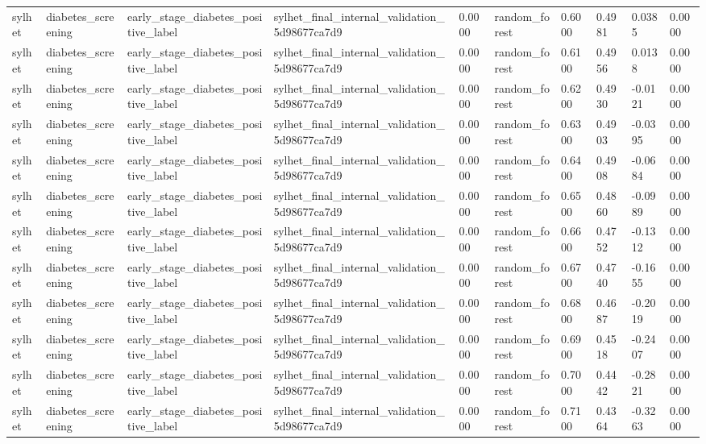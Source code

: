 \begin{tabular}{llllllllll}
sylhet & diabetes\_screening & early\_stage\_diabetes\_positive\_label & sylhet\_final\_internal\_validation\_5d98677ca7d9 & 0.0000 & random\_forest & 0.6000 & 0.4981 & 0.0385 & 0.0000 \\
sylhet & diabetes\_screening & early\_stage\_diabetes\_positive\_label & sylhet\_final\_internal\_validation\_5d98677ca7d9 & 0.0000 & random\_forest & 0.6100 & 0.4956 & 0.0138 & 0.0000 \\
sylhet & diabetes\_screening & early\_stage\_diabetes\_positive\_label & sylhet\_final\_internal\_validation\_5d98677ca7d9 & 0.0000 & random\_forest & 0.6200 & 0.4930 & -0.0121 & 0.0000 \\
sylhet & diabetes\_screening & early\_stage\_diabetes\_positive\_label & sylhet\_final\_internal\_validation\_5d98677ca7d9 & 0.0000 & random\_forest & 0.6300 & 0.4903 & -0.0395 & 0.0000 \\
sylhet & diabetes\_screening & early\_stage\_diabetes\_positive\_label & sylhet\_final\_internal\_validation\_5d98677ca7d9 & 0.0000 & random\_forest & 0.6400 & 0.4908 & -0.0684 & 0.0000 \\
sylhet & diabetes\_screening & early\_stage\_diabetes\_positive\_label & sylhet\_final\_internal\_validation\_5d98677ca7d9 & 0.0000 & random\_forest & 0.6500 & 0.4860 & -0.0989 & 0.0000 \\
sylhet & diabetes\_screening & early\_stage\_diabetes\_positive\_label & sylhet\_final\_internal\_validation\_5d98677ca7d9 & 0.0000 & random\_forest & 0.6600 & 0.4752 & -0.1312 & 0.0000 \\
sylhet & diabetes\_screening & early\_stage\_diabetes\_positive\_label & sylhet\_final\_internal\_validation\_5d98677ca7d9 & 0.0000 & random\_forest & 0.6700 & 0.4740 & -0.1655 & 0.0000 \\
sylhet & diabetes\_screening & early\_stage\_diabetes\_positive\_label & sylhet\_final\_internal\_validation\_5d98677ca7d9 & 0.0000 & random\_forest & 0.6800 & 0.4687 & -0.2019 & 0.0000 \\
sylhet & diabetes\_screening & early\_stage\_diabetes\_positive\_label & sylhet\_final\_internal\_validation\_5d98677ca7d9 & 0.0000 & random\_forest & 0.6900 & 0.4518 & -0.2407 & 0.0000 \\
sylhet & diabetes\_screening & early\_stage\_diabetes\_positive\_label & sylhet\_final\_internal\_validation\_5d98677ca7d9 & 0.0000 & random\_forest & 0.7000 & 0.4442 & -0.2821 & 0.0000 \\
sylhet & diabetes\_screening & early\_stage\_diabetes\_positive\_label & sylhet\_final\_internal\_validation\_5d98677ca7d9 & 0.0000 & random\_forest & 0.7100 & 0.4364 & -0.3263 & 0.0000 \\

\end{tabular}
